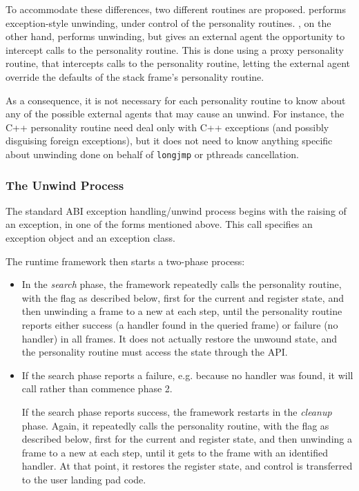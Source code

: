 To accommodate these differences, two different routines are proposed.
 performs exception-style unwinding,
under control of the personality routines. ,
on the other hand, performs unwinding, but gives an external agent the
opportunity to intercept calls to the personality routine. This is done using
a proxy personality routine, that intercepts calls to the personality routine,
letting the external agent override the defaults of the stack frame's
personality routine.

As a consequence, it is not necessary for each personality routine to know
about any of the possible external agents that may cause an unwind. For
instance, the C++ personality routine need deal only with C++ exceptions
(and possibly disguising foreign exceptions), but it does not need to know
anything specific about unwinding done on behalf of \texttt{longjmp} or
pthreads cancellation.

\subsubsection{The Unwind Process}

The standard ABI exception handling/unwind process begins with the raising
of an exception, in one of the forms mentioned above. This call specifies an
exception object and an exception class.

The runtime framework then starts a two-phase process:
\begin{itemize}
\item In the \emph{search} phase, the framework repeatedly calls the
personality routine, with the  flag as
described below, first for the current \RIP and register state, and then
unwinding a frame to a new \RIP at each step, until the personality
routine reports either success (a handler found in the queried frame)
or failure (no handler) in all frames. It does not actually restore the
unwound state, and the personality routine must access the state through
the API.

\item If the search phase reports a failure, e.g. because no handler was
found, it will call  rather than commence phase 2.

If the search phase reports success, the framework restarts in the
\emph{cleanup} phase. Again, it repeatedly calls the personality
routine, with the  flag as described
below, first for the current \RIP and register state, and then unwinding
a frame to a new \RIP at each step, until it gets to the frame with
an identified handler. At that point, it restores the register state,
and control is transferred to the user landing pad code.
\end {itemize}

